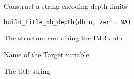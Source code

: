%
\begin{Description}\relax
Construct a string encoding depth limits
\end{Description}
%
\begin{Usage}
\begin{verbatim}
build_title_db_depth(dbin, var = NA)
\end{verbatim}
\end{Usage}
%
\begin{Arguments}
\begin{ldescription}
\item[\code{dbin}] 
The  structure containing the IMR data. 

\item[\code{var}] 
Name of the Target variable

\end{ldescription}
\end{Arguments}
%
\begin{Value}
The title string
\end{Value}
